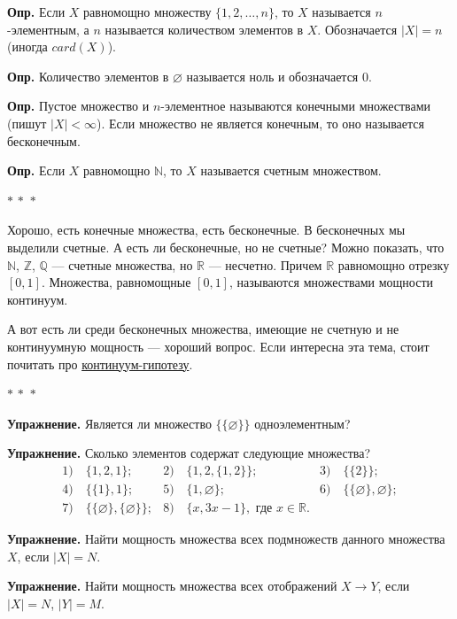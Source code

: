 \documentclass[a4paper,12pt]{article}
\newcommand{\R}{\mathbb{R}}
\newcommand{\threestars}{\begin{center}$ {\ast}\,{\ast}\,{\ast} $\end{center}}
\newcounter{th-counter}
\newcounter{df-counter}
\newcommand{\df}{\par\noindent\textbf{Опр.} }
\begin{document}
\df Если $X$ равномощно множеству $\{1, 2, \ldots, n\}$, то $X$ называется $n$-элементным, а $n$ называется количеством элементов в $X$. Обозначается $|X| = n$  (иногда $card(X)$).

\df Количество элементов в $\varnothing$ называется ноль и обозначается $0$.

\df Пустое множество и $n$-элементное называются конечными множествами (пишут $|X| < \infty$). Если множество не является конечным, то оно называется бесконечным.

\df Если $X$ равномощно $\mathbb{N}$, то $X$ называется счетным множеством.

\threestars

Хорошо, есть конечные множества, есть бесконечные. В бесконечных мы выделили счетные. А есть ли бесконечные, но не счетные? Можно показать, что $\mathbb{N}$, $\mathbb{Z}$, $\mathbb{Q}$ --- счетные множества, но $\R$ --- несчетно. Причем $\R$ равномощно отрезку $[0,1]$. Множества, равномощные $[0,1]$, называются множествами мощности континуум.

А вот есть ли среди бесконечных множества, имеющие не счетную и не континуумную мощность --- хороший вопрос. Если интересна эта тема, стоит почитать про \href{https://ru.wikipedia.org/wiki/%D0%9A%D0%BE%D0%BD%D1%82%D0%B8%D0%BD%D1%83%D1%83%D0%BC-%D0%B3%D0%B8%D0%BF%D0%BE%D1%82%D0%B5%D0%B7%D0%B0}{континуум-гипотезу}.

\threestars

\noindent\textbf{Упражнение.} Является ли множество $\{\{\varnothing\}\}$ одноэлементным?

\noindent\textbf{Упражнение.} Сколько элементов содержат следующие множества?
\[
\begin{array}{lll}
    1) \quad \{1, 2, 1\}; & 2) \quad \{1, 2, \{1, 2\}\}; & 3) \quad  \{\{2\}\}; \\
    4) \quad \{\{1\}, 1\}; & 5) \quad \{1, \varnothing\}; & 6)\quad \{\{\varnothing\}, \varnothing\}; \\
    7) \quad \{\{\varnothing\}, \{\varnothing\}\}; & 8) \quad \{x, 3x-1\}, \text{ где } x \in \R.
\end{array}
\]

\noindent\textbf{Упражнение.} Найти мощность множества всех подмножеств данного множества $X$, если $|X| = N$.

\noindent\textbf{Упражнение.} Найти мощность множества всех отображений $X \rightarrow Y$, если $|X| = N$, $|Y| = M$.

\end{document}
